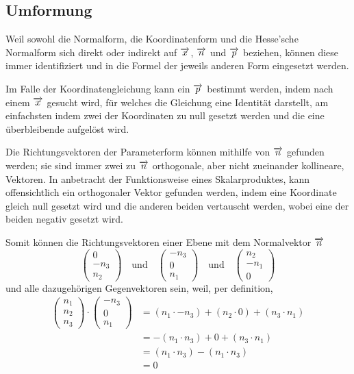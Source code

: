 \documentclass{article}
\begin{document}
\subsection{Umformung}
Weil sowohl die Normalform, die Koordinatenform und die Hesse'sche Normalform sich direkt oder indirekt  auf $\overrightarrow{x}$, $\overrightarrow{n}$ und $\overrightarrow{p}$ beziehen, können diese immer identifiziert und in die Formel der jeweils anderen Form eingesetzt werden. 
 
Im Falle der Koordinatengleichung kann ein $\overrightarrow{p}$ bestimmt werden, indem nach einem $\overrightarrow{x}$ gesucht wird, für welches die Gleichung eine Identität darstellt, am einfachsten indem zwei der Koordinaten zu null gesetzt werden und die eine überbleibende aufgelöst wird.
 
Die Richtungsvektoren der Parameterform können mithilfe von $\overrightarrow{n}$ gefunden werden; sie sind immer zwei zu $\overrightarrow{n}$ orthogonale, aber nicht zueinander kollineare, Vektoren. In anbetracht der Funktionsweise eines Skalarproduktes, kann offensichtlich ein orthogonaler Vektor gefunden werden, indem eine Koordinate gleich null gesetzt wird und die anderen beiden vertauscht werden, wobei eine der beiden negativ gesetzt wird.
 
Somit können die Richtungsvektoren einer Ebene mit dem Normalvektor $\overrightarrow{n}$ 
\[
 \begin{pmatrix} 0 \\ -n_3 \\ n_2 \end{pmatrix}
 \quad \text{und} \quad
 \begin{pmatrix} -n_3 \\ 0 \\ n_1 \end{pmatrix} 
 \quad \text{und} \quad
 \begin{pmatrix} n_2 \\ -n_1 \\ 0 \end{pmatrix}  
\]
und alle dazugehörigen Gegenvektoren sein, weil, per definition,
\begin{align*} 
 \begin{pmatrix} n_1 \\ n_2 \\ n_3 \end{pmatrix}
 \cdot
 \begin{pmatrix} -n_3 \\ 0 \\ n_1 \end{pmatrix}
 &= (n_1 \cdot -n_3) + (n_2 \cdot 0) + (n_3 \cdot n_1) \\
 &= -(n_1 \cdot n_3) + 0 + (n_3 \cdot n_1) \\
 &= (n_1 \cdot n_3) - (n_1 \cdot n_3) \\
 &= 0 
\end{align*}  
\end{document}
